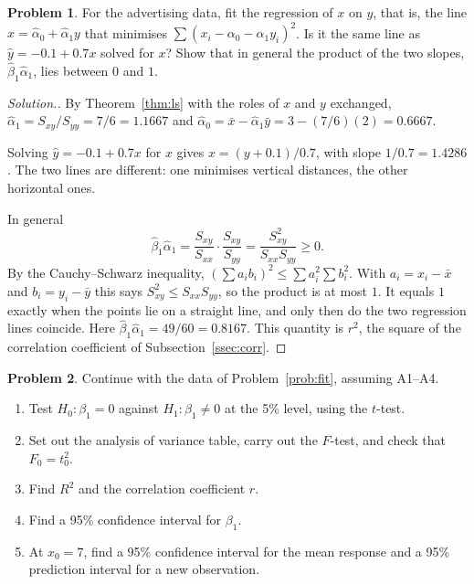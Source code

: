 \documentclass[11pt,a4paper]{article}
\numberwithin{equation}{section}
\theoremstyle{definition}
\newtheorem{problemx}{Problem}[subsection]
\newenvironment{problem}{\begin{problemx}}{\end{problemx}}
\newenvironment{solution}
  {\renewcommand{\qedsymbol}{}\begin{proof}[\textit{Solution}.]}
  {\end{proof}}
\begin{document}
\begin{problem}\label{prob:xony}
For the advertising data, fit the regression of $x$ on $y$, that is, the line
$\hat x = \hat\alpha_0 + \hat\alpha_1 y$ that minimises $\sum (x_i - \alpha_0 - \alpha_1 y_i)^2$.
Is it the same line as $\hat y = -0.1 + 0.7x$ solved for $x$? Show that in general the
product of the two slopes, $\hat\beta_1 \hat\alpha_1$, lies between $0$ and $1$.
\end{problem}

\begin{solution}
By Theorem~\ref{thm:ls} with the roles of $x$ and $y$ exchanged,
$\hat\alpha_1 = S_{xy}/S_{yy} = 7/6 = 1.1667$ and
$\hat\alpha_0 = \bar x - \hat\alpha_1 \bar y = 3 - (7/6)(2) = 0.6667$.

Solving $\hat y = -0.1 + 0.7x$ for $x$ gives $x = (y + 0.1)/0.7$, with slope
$1/0.7 = 1.4286$. The two lines are different: one minimises vertical distances, the other
horizontal ones.

In general
\[
\hat\beta_1 \hat\alpha_1 = \frac{S_{xy}}{S_{xx}} \cdot \frac{S_{xy}}{S_{yy}} = \frac{S_{xy}^2}{S_{xx} S_{yy}} \ge 0 .
\]
By the Cauchy--Schwarz inequality,
$\left( \sum a_i b_i \right)^2 \le \sum a_i^2 \sum b_i^2$. With $a_i = x_i - \bar x$ and
$b_i = y_i - \bar y$ this says $S_{xy}^2 \le S_{xx} S_{yy}$, so the product is at most $1$.
It equals $1$ exactly when the points lie on a straight line, and only then do the two
regression lines coincide. Here $\hat\beta_1 \hat\alpha_1 = 49/60 = 0.8167$. This quantity
is $r^2$, the square of the correlation coefficient of Subsection~\ref{ssec:corr}.
\end{solution}

\begin{problem}\label{prob:full}
Continue with the data of Problem~\ref{prob:fit}, assuming A1--A4.
\begin{enumerate}[label=(\alph*)]
\item Test $H_0\colon \beta_1 = 0$ against $H_1\colon \beta_1 \neq 0$ at the 5\% level, using the $t$-test.
\item Set out the analysis of variance table, carry out the $F$-test, and check that $F_0 = t_0^2$.
\item Find $R^2$ and the correlation coefficient $r$.
\item Find a 95\% confidence interval for $\beta_1$.
\item At $x_0 = 7$, find a 95\% confidence interval for the mean response and a 95\% prediction interval for a new observation.
\end{enumerate}
\end{problem}
\end{document}

